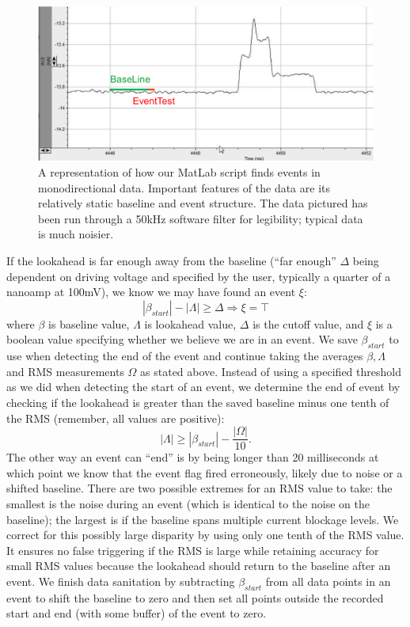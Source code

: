 \documentclass[aps,prl,preprint,groupedaddress]{revtex4}
\begin{document}
\begin{figure}[h]
\centering
\includegraphics[width=.8\textwidth]{figures/find-events}
\caption{A representation of how our MatLab script finds events in monodirectional data. Important features of the data are its relatively static baseline and event structure. The data pictured has been run through a 50kHz software filter for legibility; typical data is much noisier.}
\label{fig:find-events}
\end{figure}

If the lookahead is far enough away from the baseline (``far enough'' \(\Delta\) being dependent on driving voltage and specified by the user, typically a quarter of a nanoamp at 100mV), we know we may have found an event \(\xi\):
\begin{equation} |\beta_{start}| - |\Lambda| \geq \Delta \Rightarrow \xi = \top \label{eq:event-start}\end{equation}
where \(\beta\) is baseline value, \(\Lambda\) is lookahead value, \(\Delta\) is the cutoff value, and \(\xi\) is a boolean value specifying whether we believe we are in an event.
We save \(\beta_{start}\) to use when detecting the end of the event and continue taking the averages \(\beta, \Lambda\) and RMS measurements \(\Omega\) as stated above.
Instead of using a specified threshold as we did when detecting the start of an event, we determine the end of event by checking if the lookahead is greater than the saved baseline minus one tenth of the RMS (remember, all values are positive):
\begin{equation}|\Lambda| \geq |\beta_{start}| - \frac{|\Omega|}{10}. \label{eq:event-end}\end{equation}
The other way an event can ``end'' is by being longer than 20 milliseconds at which point we know that the event flag fired erroneously, likely due to noise or a shifted baseline.
There are two possible extremes for an RMS value to take: the smallest is the noise during an event (which is identical to the noise on the baseline); the largest is if the baseline spans multiple current blockage levels.
We correct for this possibly large disparity by using only one tenth of the RMS value.
It ensures no false triggering if the RMS is large while retaining accuracy for small RMS values because the lookahead should return to the baseline after an event.
We finish data sanitation by subtracting \(\beta_{start}\) from all data points in an event to shift the baseline to zero and then set all points outside the recorded start and end (with some buffer) of the event to zero.
\end{document}
